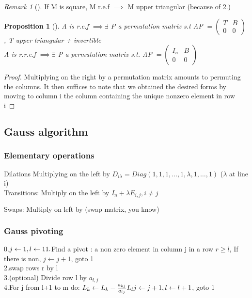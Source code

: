 \documentclass{article}
\newtheorem{proposition}{Proposition}
\theoremstyle{definition}
\theoremstyle{remark}
\newtheorem*{remark}{Remark}
\newcommand{\Prop}[3]{\begin{proposition}[#1]\label{#2}#3\end{proposition}}
\newcommand{\Rem}[3]{\begin{remark}[#1]\label{#2}#3\end{remark}}
\newcommand{\Proof}[1]{\begin{proof}#1\end{proof}}
\begin{document}
	\Rem{}{}{If M is square, M r.e.f $\implies$ M upper triangular (because of 2.)}
	
	\Prop{}{}{A is r.e.f $\implies \exists$ P a permutation matrix s.t AP $= \begin{pmatrix}
		T&B\\0&0
		\end{pmatrix}$, T upper triangular + invertible\\
		
		A is r.r.e.f $\implies \exists$ P a permutation matrix s.t. AP $= \begin{pmatrix}
		I_n&B\\0&0
		\end{pmatrix}$}
	
	\Proof{Multiplying on the right by a permutation matrix amounts to permuting the columns. It then suffices to note that we obtained the desired forms by moving to column i the column containing the unique nonzero element in row i}
	
	\subsection{Gauss algorithm}
	\subsubsection{Elementary operations}
	Dilations Multiplying on the left by $D_{i\lambda} = Diag(1,1,1,\dots,1,\lambda,1,\dots,1)$ ($\lambda$ at line i)\\
	
	Transitions: Multiply on the left by $I_n + \lambda E_{i,j}, i\neq j$
	
	Swaps: Multiply on left  by (swap matrix, you know)
	
	\subsubsection{Gauss pivoting}
	0.$j \leftarrow 1, l \leftarrow 1\\
	1.$Find a pivot : a non zero element in column j in a row $r\geq l$, If there is non, $j \leftarrow j+1$, goto 1 \\
	2.swap rows r by l\\
	3.(optional) Divide row l by $a_{l,j}$\\
	4.For j from l+1 to m do:
	\indent $L_k \leftarrow L_k - \frac{a_{kj}}{a_{lj}}L_l\\
	j \leftarrow j+1, l \leftarrow l+1$, goto 1\\
	
\end{document}
